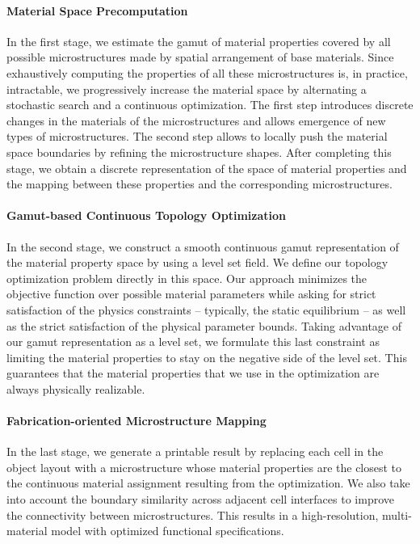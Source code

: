\paragraph{Material Space Precomputation}
In the first stage, we estimate the gamut of material properties covered by all possible microstructures made by spatial arrangement of base materials. 
Since exhaustively computing the properties of all these microstructures is, in practice, intractable, we progressively increase the material space by alternating a stochastic search and a continuous optimization. The first step introduces discrete changes in the materials of the microstructures and allows emergence of new types of microstructures. The second step allows to locally push the material space boundaries by refining the microstructure shapes. After completing this stage, we obtain a discrete representation of the space of material properties and the mapping between these properties and the corresponding microstructures.

\paragraph{Gamut-based Continuous Topology Optimization}
In the second stage, we construct a smooth continuous gamut representation of the material property space by using a level set field. We define our topology optimization problem directly in this space. Our approach minimizes the objective function over possible material parameters while asking for strict satisfaction of the physics constraints -- typically, the static equilibrium -- as well as the strict satisfaction of the physical parameter bounds. Taking advantage of our gamut representation as a level set, we formulate this last constraint as limiting the material properties to stay on the negative side of the level set. This guarantees that the material properties that we use in the optimization are always physically realizable.

\paragraph{Fabrication-oriented Microstructure Mapping}
In the last stage, we generate a printable result by replacing each cell in the object layout with a microstructure whose material properties are the closest to the continuous material assignment resulting from the optimization. We also take into account the boundary similarity across adjacent cell interfaces to improve the connectivity between microstructures. This results in a high-resolution, multi-material model with optimized functional specifications.


